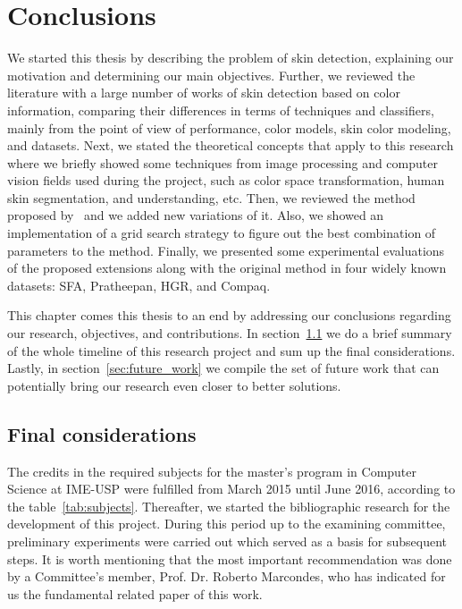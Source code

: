 \chapter{Conclusions}
\label{cap:conclusoes}

We started this thesis by describing the problem of skin detection, explaining our motivation and determining our main objectives. Further, we reviewed the literature with a large number of works of skin detection based on color information, comparing their differences in terms of techniques and classifiers, mainly from the point of view of performance, color models, skin color modeling, and datasets. Next, we stated the theoretical concepts that apply to this research where we briefly showed some techniques from image processing and computer vision fields used during the project, such as color space transformation, human skin segmentation, and understanding, etc. Then, we reviewed the method proposed by~\citet{brancati:17} and we added new variations of it. Also, we showed an implementation of a grid search strategy to figure out the best combination of parameters to the method. Finally, we presented some experimental evaluations of the proposed extensions along with the original method in four widely known datasets: SFA, Pratheepan, HGR, and Compaq.

This chapter comes this thesis to an end by addressing our conclusions regarding our research, objectives, and contributions. In section~\ref{sec:final_considerations} we do a brief summary of the whole timeline of this research project and sum up the final considerations. Lastly, in section~\ref{sec:future_work} we compile the set of future work that can potentially bring our research even closer to better solutions.


\section{Final considerations}
\label{sec:final_considerations}
The credits in the required subjects for the master's program in Computer Science at IME-USP were fulfilled from March 2015 until June 2016, according to the table~\ref{tab:subjects}. Thereafter, we started the bibliographic research for the development of this project. During this period up to the examining committee, preliminary experiments were carried out which served as a basis for subsequent steps. It is worth mentioning that the most important recommendation was done by a Committee's member, Prof. Dr. Roberto Marcondes, who has indicated for us the fundamental related paper of this work.


